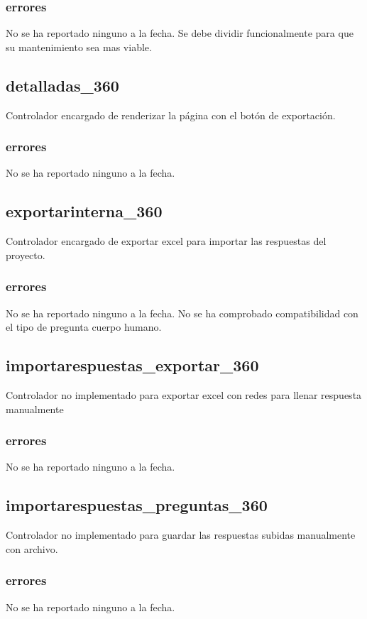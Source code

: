 \documentclass[10pt,a4paper]{book}
\begin{document}
	\subsubsection{errores}
	No se ha reportado ninguno a la fecha. Se debe dividir funcionalmente para que su mantenimiento sea mas viable.

	\subsection{detalladas\_360}
	Controlador encargado de renderizar la página con el botón de exportación.
	\subsubsection{errores}
	No se ha reportado ninguno a la fecha.

	\subsection{exportarinterna\_360}
	Controlador encargado de exportar excel para importar las respuestas del proyecto.
	\subsubsection{errores}
	No se ha reportado ninguno a la fecha. No se ha comprobado compatibilidad con el tipo de pregunta cuerpo humano.

	\subsection{importarespuestas\_exportar\_360}
	Controlador no implementado para exportar excel con redes para llenar respuesta manualmente
	\subsubsection{errores}
	No se ha reportado ninguno a la fecha.

	\subsection{importarespuestas\_preguntas\_360}
	Controlador no implementado para guardar las respuestas subidas manualmente con archivo.
	\subsubsection{errores}
	No se ha reportado ninguno a la fecha.
\end{document}
